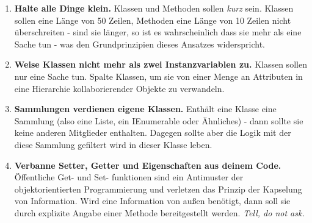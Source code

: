 \begin{enumerate}
    \item \textbf{Halte alle Dinge klein.} Klassen und Methoden sollen \textit{kurz} sein. Klassen sollen eine Länge von 50 Zeilen, Methoden eine Länge von 10 Zeilen nicht überschreiten - sind sie länger, so ist es wahrscheinlich dass sie mehr als eine Sache tun - was den Grundprinzipien dieses Ansatzes widerspricht.
    \item \textbf{Weise Klassen nicht mehr als zwei Instanzvariablen zu.} Klassen sollen nur eine Sache tun. Spalte Klassen, um sie von einer Menge an Attributen in eine Hierarchie kollaborierender Objekte zu verwandeln.
    \item \textbf{Sammlungen verdienen eigene Klassen.} Enthält eine Klasse eine Sammlung (also eine Liste, ein IEnumerable oder Ähnliches) - dann sollte sie keine anderen Mitglieder enthalten. Dagegen sollte aber die Logik mit der diese Sammlung gefiltert wird in dieser Klasse leben.
    \item \textbf{Verbanne Setter, Getter und Eigenschaften aus deinem Code.} Öffentliche Get- und Set- funktionen sind ein Antimuster der objektorientierten Programmierung und verletzen das Prinzip der Kapselung von Information. Wird eine Information von außen benötigt, dann soll sie durch explizite Angabe einer Methode bereitgestellt werden. \textit{Tell, do not ask.}
\end{enumerate}

